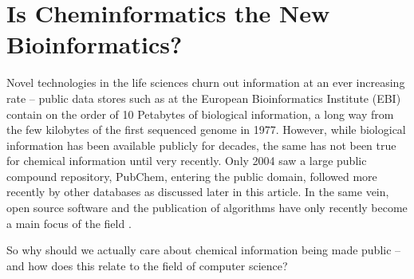 \documentclass{sig-alternate}
\begin{document}

\section{Is Cheminformatics the New Bioinformatics?}

Novel technologies in the life sciences churn out information at an ever
increasing rate – public data stores such as at the European Bioinformatics
Institute (EBI) contain on the order of 10 Petabytes of biological information,
a long way from the few kilobytes of the first sequenced genome in 1977.
However, while biological information has been available publicly for decades,
the same has not been true for chemical information until very recently. Only
2004 saw a large public compound repository, PubChem, entering the public
domain, followed more recently by other databases as discussed later in this
article. In the same vein, open source software and the publication of
algorithms have only recently become a main focus of the field \cite{faulon2010}.

So why should we actually care about chemical information being made public --
and how does this relate to the field of computer science?
\end{document}
